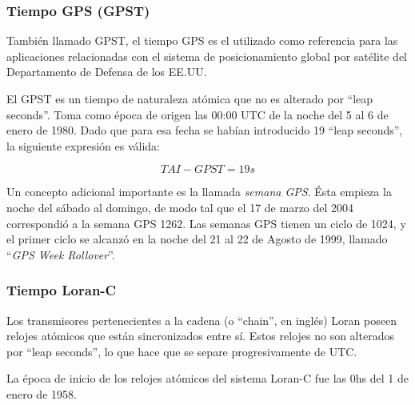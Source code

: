
\subsubsection{Tiempo GPS (GPST)}
\label{sec:tiempo.gps}


También llamado GPST, el tiempo GPS es el utilizado como referencia para las aplicaciones relacionadas con el sistema de posicionamiento global por satélite del Departamento de Defensa de los EE.UU.

El GPST es un tiempo de naturaleza atómica que no es alterado por ``leap seconds''. Toma como época de origen las 00:00 UTC de la noche del 5 al 6 de enero de 1980. Dado que para esa fecha se habían introducido 19 ``leap seconds'', la siguiente expresión es válida:

\[ TAI - GPST = 19 s
\]

\begin{myboxAzul}{}
  Un concepto adicional importante es la llamada {\it semana
    GPS}. Ésta empieza la noche del sábado al domingo, de modo tal que
  el 17 de marzo del 2004 correspondió a la semana GPS 1262. Las
  semanas GPS tienen un ciclo de 1024, y el primer ciclo se alcanzó en
  la noche del 21 al 22 de Agosto de 1999, llamado ``{\it GPS Week Rollover}''.
\end{myboxAzul}

\subsubsection{Tiempo Loran-C}
\label{sec:tiempo.loran.c}


Los transmisores pertenecientes a la cadena (o ``chain'', en inglés) Loran poseen relojes atómicos que están sincronizados entre sí. Estos relojes no son alterados por ``leap seconds'', lo que hace que se separe progresivamente de UTC.

\begin{myboxAzul}{}
  La época de inicio de los relojes atómicos del sistema Loran-C fue
  las 0hs del 1 de enero de 1958.
\end{myboxAzul}


